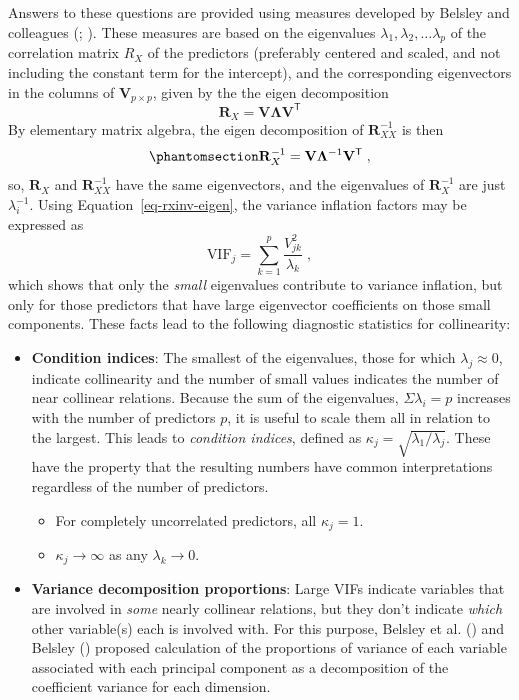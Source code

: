 \documentclass[
  letterpaper,
  10pt,
  krantz2]{krantz}
\providecommand{\tightlist}{%
  \setlength{\itemsep}{0pt}\setlength{\parskip}{0pt}}\usepackage{longtable,booktabs,array}
\begin{document}
Answers to these questions are provided using measures developed by
Belsley and colleagues (; ). These measures are
based on the eigenvalues \(\lambda_1, \lambda_2, \dots \lambda_p\) of
the correlation matrix \(R_{X}\) of the predictors (preferably centered
and scaled, and not including the constant term for the intercept), and
the corresponding eigenvectors in the columns of
\(\mathbf{V}_{p \times p}\), given by the the eigen decomposition \[
\mathbf{R}_{X} = \mathbf{V} \mathbf{\Lambda} \mathbf{V}^\mathsf{T}
\] By elementary matrix algebra, the eigen decomposition of
\(\mathbf{R}_{XX}^{-1}\) is then
\begin{equation}\phantomsection\label{eq-rxinv-eigen}{
\mathbf{R}_{X}^{-1} = \mathbf{V} \mathbf{\Lambda}^{-1} \mathbf{V}^\mathsf{T} \; ,
}\end{equation} so, \(\mathbf{R}_{X}\) and \(\mathbf{R}_{XX}^{-1}\) have
the same eigenvectors, and the eigenvalues of \(\mathbf{R}_{X}^{-1}\)
are just \(\lambda_i^{-1}\). Using Equation~\ref{eq-rxinv-eigen}, the
variance inflation factors may be expressed as \[
\text{VIF}_j = \sum_{k=1}^p \frac{V^2_{jk}}{\lambda_k} \; ,
\] which shows that only the \emph{small} eigenvalues contribute to
variance inflation, but only for those predictors that have large
eigenvector coefficients on those small components. These facts lead to
the following diagnostic statistics for collinearity:

\begin{itemize}
\item
  \textbf{Condition indices}: The smallest of the eigenvalues, those for
  which \(\lambda_j \approx 0\), indicate collinearity and the number of
  small values indicates the number of near collinear relations. Because
  the sum of the eigenvalues, \(\Sigma \lambda_i = p\) increases with
  the number of predictors \(p\), it is useful to scale them all in
  relation to the largest. This leads to \emph{condition indices},
  defined as \(\kappa_j = \sqrt{ \lambda_1 / \lambda_j}\). These have
  the property that the resulting numbers have common interpretations
  regardless of the number of predictors.

  \begin{itemize}
  \tightlist
  \item
    For completely uncorrelated predictors, all \(\kappa_j = 1\).
  \item
    \(\kappa_j \rightarrow \infty\) as any \(\lambda_k \rightarrow 0\).
  \end{itemize}
\item
  \textbf{Variance decomposition proportions}: Large VIFs indicate
  variables that are involved in \emph{some} nearly collinear relations,
  but they don't indicate \emph{which} other variable(s) each is
  involved with. For this purpose, Belsley et al.
  () and Belsley
  () proposed calculation of the
  proportions of variance of each variable associated with each
  principal component as a decomposition of the coefficient variance for
  each dimension.
\end{itemize}
\end{document}
